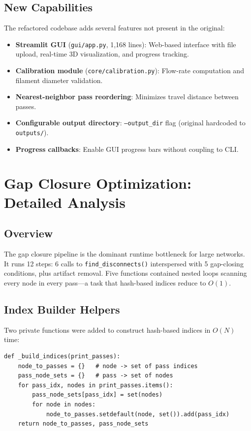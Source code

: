 \documentclass[11pt,a4paper]{article}
\begin{document}
\subsection{New Capabilities}

The refactored codebase adds several features not present in the original:

\begin{itemize}[leftmargin=2em]
    \item \textbf{Streamlit GUI} (\texttt{gui/app.py}, 1,168 lines): Web-based interface with file upload, real-time 3D visualization, and progress tracking.
    \item \textbf{Calibration module} (\texttt{core/calibration.py}): Flow-rate computation and filament diameter validation.
    \item \textbf{Nearest-neighbor pass reordering}: Minimizes travel distance between passes.
    \item \textbf{Configurable output directory}: \texttt{--output\_dir} flag (original hardcoded to \texttt{outputs/}).
    \item \textbf{Progress callbacks}: Enable GUI progress bars without coupling to CLI.
\end{itemize}


\section{Gap Closure Optimization: Detailed Analysis}
\label{sec:gap-closure-detail}

\subsection{Overview}

The gap closure pipeline is the dominant runtime bottleneck for large networks. It runs 12 steps: 6 calls to \texttt{find\_disconnects()} interspersed with 5 gap-closing conditions, plus artifact removal. Five functions contained nested loops scanning every node in every pass---a task that hash-based indices reduce to $O(1)$.

\subsection{Index Builder Helpers}

Two private functions were added to construct hash-based indices in $O(N)$ time:

\begin{lstlisting}[caption={Index builder: node $\rightarrow$ passes mapping}]
def _build_indices(print_passes):
    node_to_passes = {}   # node -> set of pass indices
    pass_node_sets = {}   # pass -> set of nodes
    for pass_idx, nodes in print_passes.items():
        pass_node_sets[pass_idx] = set(nodes)
        for node in nodes:
            node_to_passes.setdefault(node, set()).add(pass_idx)
    return node_to_passes, pass_node_sets
\end{lstlisting}
\end{document}
